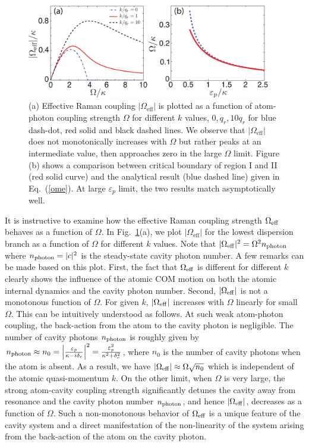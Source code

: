 \documentclass[atoms,article,submit,moreauthors,dvi2pdf,12pt,a4paper]{mdpi}
\begin{document}
\begin{figure}[htp]
\includegraphics[width=0.95\textwidth]{fig2}\caption{(a) Effective Raman coupling $|\Omega_\text{eff}|$ is plotted as a function of atom-photon coupling strength $\Omega$ for different $k$ values, $0$,\,$q_r$,\,$10q_r$ for blue dash-dot, red solid and black dashed  lines. We observe that $|\Omega_\text{eff}|$ does not monotonically  increases with $\Omega$ but rather peaks at an intermediate value, then approaches zero in the large $\Omega$ limit. Figure (b) shows a comparison between critical boundary of region I and II (red solid curve) and the analytical result (blue dashed line) given in Eq.~(\ref{ome}). At large $\varepsilon_p$ limit, the two results match asymptotically well.  }\label{fig2}
\end{figure}

It is instructive to examine how the effective Raman coupling strength $\Omega_{\rm eff}$ behaves as a function of $\Omega$. In Fig.~\ref{fig2}(a), we plot $|\Omega_\text{eff}|$ for the lowest dispersion branch as a function of $\Omega$ for different $k$ values. Note that $|\Omega_{\rm eff}|^2 = \Omega^2 n_{\rm photon}$ where $n_{\rm photon}=|c|^2$ is the steady-state cavity photon number. A few remarks can be made based on this plot. First, the fact that $\Omega_{\rm eff}$ is different for different $k$ clearly shows the influence of the atomic COM motion on both the atomic internal dynamics and the cavity photon number. Second, $|\Omega_{\rm eff}|$ is not a monotonous function of $\Omega$. For given $k$, $|\Omega_{\rm eff}|$ increases with $\Omega$ linearly for small $\Omega$. This can be intuitively understood as follows. At such weak atom-photon coupling, the back-action from the atom to the cavity photon is negligible. The number of cavity photons $n_{\rm photon}$ is roughly given by $n_{\rm photon} \approx n_0=\left|\frac{\varepsilon_{p}}{\kappa-i\delta_{c}}\right|^2= \frac{\varepsilon_p^2}{\kappa^2+ \delta_c^2}$, where $n_0$ is the number of cavity photons when the atom is absent. As a result, we have $|\Omega_{\rm eff}| \approx \Omega \sqrt{n_0}$ which is independent of the atomic quasi-momentum $k$. On the other limit, when $\Omega$ is very large, the strong atom-cavity coupling strength significantly detunes the cavity away from resonance and the cavity photon number $n_{\rm photon}$, and hence $|\Omega_{\rm eff}|$, decreases as a function of $\Omega$. Such a non-monotonous behavior of $\Omega_{\rm eff}$ is a unique feature of the cavity system and a direct manifestation of the non-linearity of the system arising from the back-action of the atom on the cavity photon.
\end{document}
